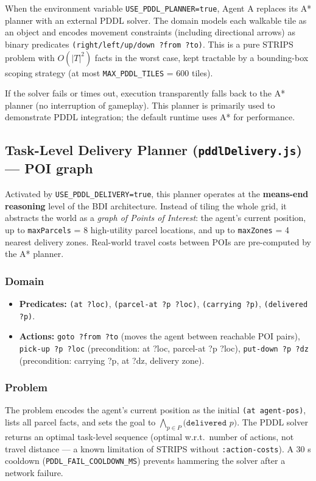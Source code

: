 \documentclass[10pt,a4paper,twocolumn]{article}
\begin{document}
When the environment variable \texttt{USE\_PDDL\_PLANNER=true}, Agent A
replaces its A* planner with an external PDDL solver.  The domain models
each walkable tile as an object and encodes movement constraints (including
directional arrows) as binary predicates
\texttt{(right/left/up/down ?from ?to)}.  This is a pure STRIPS problem with
$O(|T|^2)$ facts in the worst case, kept tractable by a bounding-box scoping
strategy (at most \texttt{MAX\_PDDL\_TILES} = 600 tiles).

If the solver fails or times out, execution transparently falls back to the A*
planner (no interruption of gameplay).  This planner is primarily used to
demonstrate PDDL integration; the default runtime uses A* for performance.

\subsection{Task-Level Delivery Planner (\texttt{pddlDelivery.js}) — POI graph}

Activated by \texttt{USE\_PDDL\_DELIVERY=true}, this planner operates at the
\textbf{means-end reasoning} level of the BDI architecture.  Instead of tiling
the whole grid, it abstracts the world as a \emph{graph of Points of Interest}:
the agent's current position, up to \texttt{maxParcels} = 8 high-utility parcel
locations, and up to \texttt{maxZones} = 4 nearest delivery zones.  Real-world
travel costs between POIs are pre-computed by the A* planner.

\subsubsection*{Domain}
\begin{itemize}[noitemsep]
  \item \textbf{Predicates:} \texttt{(at ?loc)}, \texttt{(parcel-at ?p ?loc)},
        \texttt{(carrying ?p)}, \texttt{(delivered ?p)}.
  \item \textbf{Actions:} \texttt{goto ?from ?to} (moves the agent between
        reachable POI pairs), \texttt{pick-up ?p ?loc} (precondition: at ?loc,
        parcel-at ?p ?loc), \texttt{put-down ?p ?dz} (precondition: carrying ?p,
        at ?dz, delivery zone).
\end{itemize}

\subsubsection*{Problem}
The problem encodes the agent's current position as the initial \texttt{(at
agent-pos)}, lists all parcel facts, and sets the goal to
$\bigwedge_{p \in P} \texttt{(delivered } p\texttt{)}$.  The PDDL solver
returns an optimal task-level sequence (optimal w.r.t.\ number of actions, not
travel distance — a known limitation of STRIPS without \texttt{:action-costs}).
A 30 s cooldown (\texttt{PDDL\_FAIL\_COOLDOWN\_MS}) prevents hammering the
solver after a network failure.
\end{document}
